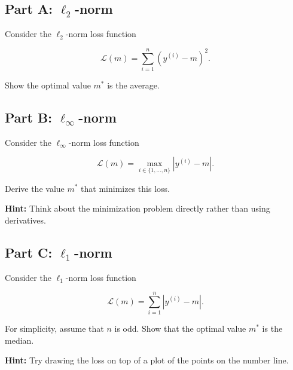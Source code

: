 \documentclass{article}
\begin{document}
\subsection*{Part A: $\ell_2$-norm}

Consider the $\ell_2$-norm loss function

$$
\mathcal{L}(m) = \sum_{i=1}^n (y^{(i)} - m)^2.
$$

Show the optimal value $m^*$ is the average.

\subsection*{Part B: $\ell_\infty$-norm}

Consider the $\ell_\infty$-norm loss function

$$
\mathcal{L}(m) = \max_{i \in \{1, \ldots, n\}} |y^{(i)} - m|.
$$

Derive the value $m^*$ that minimizes this loss.

\textbf{Hint:} Think about the minimization problem directly rather than using derivatives.

\subsection*{Part C: $\ell_1$-norm}

Consider the $\ell_1$-norm loss function

$$
\mathcal{L}(m) = \sum_{i=1}^n |y^{(i)} - m|.
$$

For simplicity, assume that $n$ is odd.
Show that the optimal value $m^*$ is the median.

\textbf{Hint:} Try drawing the loss on top of a plot of the points on the number line.

%
\end{document}

